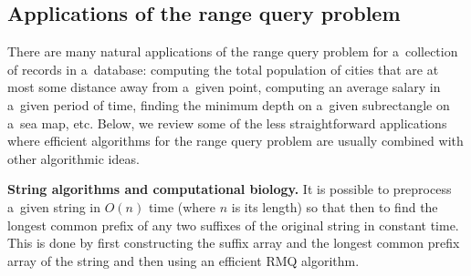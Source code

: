 \documentclass{toc}
\begin{document}
%
%

\subsection{Applications of the range query problem}\label{subseq:rmqapp}
There are many natural applications of the
range query
problem for a~collection of records in a~database: computing the total population of cities that are at most some distance away from a~given point, computing an average salary in a~given period of time, finding the minimum depth on a~given subrectangle on a~sea map, etc. Below, we review some of the less straightforward applications where efficient algorithms for the
range query
problem are usually combined with other algorithmic ideas.

\textbf{String algorithms and computational biology.}
It is possible to preprocess a~given string in $O(n)$ time (where $n$ is its length)
so that %
then to  %
find the longest common prefix of any two suffixes of the original string in constant time. This is done by first constructing the suffix array and the longest common prefix array of the string and then using an efficient RMQ algorithm.
\end{document}
